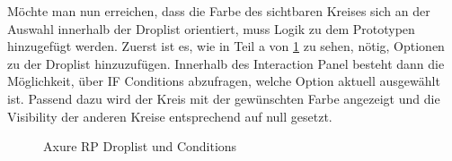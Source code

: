 Möchte man nun erreichen, dass die Farbe des sichtbaren Kreises sich an der Auswahl innerhalb der Droplist orientiert, muss Logik zu dem Prototypen hinzugefügt werden.
Zuerst ist es, wie in Teil a von \cref{fig:Droplist} zu sehen, nötig, Optionen zu der Droplist hinzuzufügen.
Innerhalb des Interaction Panel besteht dann die Möglichkeit, über IF Conditions abzufragen, welche Option aktuell ausgewählt ist.
Passend dazu wird der Kreis mit der gewünschten Farbe angezeigt und die Visibility der anderen Kreise entsprechend auf null gesetzt.

\begin{figure}%
\centering
{}%
\qquad
{}%

\caption{Axure RP Droplist und Conditions}%
\label{fig:Droplist}
\end{figure}

